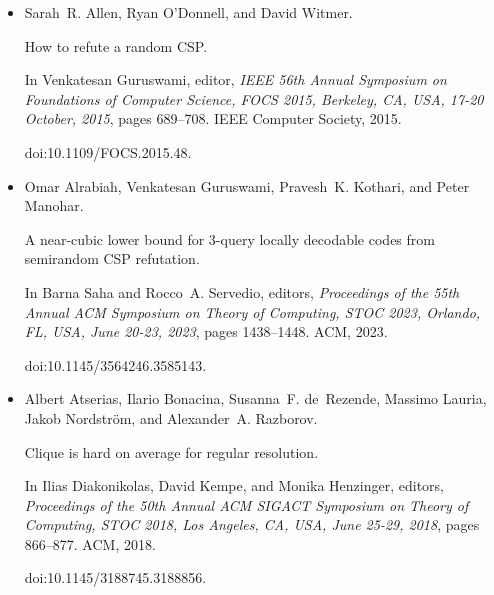 \documentclass[10pt,a4paper]{article}
\begin{document}
\begin{itemize}
Lower bounds for polynomial calculus: Non-binomial case.


\emph{Proceedings of the Steklov Institute of Mathematics},
242:18–35, 2003.


Available at
http://people.cs.uchicago.edu/˜razborov/files/misha.pdf. Preliminary
version in \emph{FOCS ’01}.





\item[] 
[6]

Sarah R. Allen, Ryan O’Donnell, and David Witmer.


How to refute a random CSP.


In Venkatesan Guruswami, editor, \emph{IEEE 56th Annual Symposium on
Foundations of Computer Science, FOCS 2015, Berkeley, CA, USA, 17-20
October, 2015}, pages 689–708. IEEE Computer Society, 2015.


doi:10.1109/FOCS.2015.48.





\item[] 
[7]

Omar Alrabiah, Venkatesan Guruswami, Pravesh K. Kothari, and Peter Manohar.


A near-cubic lower bound for 3-query locally decodable codes from
semirandom CSP refutation.


In Barna Saha and Rocco A. Servedio, editors, \emph{Proceedings of the
55th Annual ACM Symposium on Theory of Computing, STOC 2023, Orlando, FL,
USA, June 20-23, 2023}, pages 1438–1448. ACM, 2023.


doi:10.1145/3564246.3585143.





\item[] 
[8]

Albert Atserias, Ilario Bonacina, Susanna F. de Rezende, Massimo Lauria, Jakob
Nordström, and Alexander A. Razborov.


Clique is hard on average for regular resolution.


In Ilias Diakonikolas, David Kempe, and Monika Henzinger, editors,
\emph{Proceedings of the 50th Annual ACM SIGACT Symposium on Theory of
Computing, STOC 2018, Los Angeles, CA, USA, June 25-29, 2018}, pages
866–877. ACM, 2018.


doi:10.1145/3188745.3188856.






\end{itemize}
\end{document}
